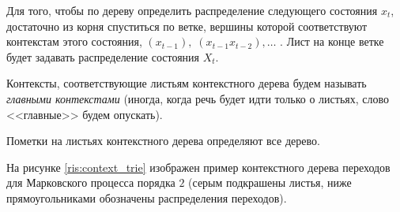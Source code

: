 \documentclass{matmex-diploma-custom}
\begin{document}
Для того, чтобы по дереву определить распределение следующего состояния $ x_{t} $, достаточно из корня спуститься по ветке, вершины которой соответствуют контекстам этого состояния, $(x_{t-1}),\; (x_{t-1}x_{t-2}), \ldots$ . Лист на конце ветке будет задавать распределение состояния $ X_{t} $.

Контексты, соответствующие листьям контекстного дерева будем называть \textit{главными контекстами} (иногда, когда речь будет идти только о листьях, слово <<главные>> будем опускать).

\begin{remark}
Пометки на листьях контекстного дерева определяют все дерево.
\end{remark}

На рисунке \ref{ris:context_trie} изображен пример контекстного дерева переходов для Марковского процесса порядка $ 2 $ (серым подкрашены листья, ниже прямоугольниками обозначены распределения переходов).
\end{document}
